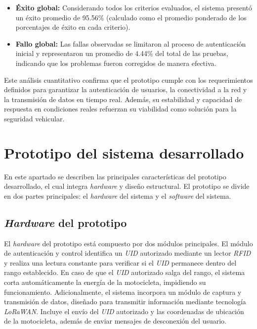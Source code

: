 \begin{itemize}
    \item \textbf{Éxito global:} Considerando todos los criterios evaluados, el sistema presentó un éxito promedio de 95.56\% (calculado como el promedio ponderado de los porcentajes de éxito en cada criterio).
    \item \textbf{Fallo global:} Las fallas observadas se limitaron al proceso de autenticación inicial y representaron un promedio de 4.44\% del total de las pruebas, indicando que los problemas fueron corregidos de manera efectiva.
\end{itemize}

Este análisis cuantitativo confirma que el prototipo cumple con los requerimientos definidos para garantizar la autenticación de usuarios, la conectividad a la red y la transmisión de datos en tiempo real. Además, su estabilidad y capacidad de respuesta en condiciones reales refuerzan su viabilidad como solución para la seguridad vehicular.

\section{Prototipo del sistema desarrollado}

En este apartado se describen las principales características del prototipo desarrollado, el cual integra \textit{hardware} y diseño estructural. El prototipo se divide en dos partes principales: el \textit{hardware} del sistema y el \textit{software} del sistema. 

\subsection{\textit{Hardware} del prototipo}

El \textit{hardware} del prototipo está compuesto por dos módulos principales. El módulo de autenticación y control identifica un \textit{UID} autorizado mediante un lector \textit{RFID} y realiza una lectura constante para verificar si el \textit{UID} permanece dentro del rango establecido. En caso de que el \textit{UID} autorizado salga del rango, el sistema corta automáticamente la energía de la motocicleta, impidiendo su funcionamiento. Adicionalmente, el sistema incorpora un módulo de captura y transmisión de datos, diseñado para transmitir información mediante tecnología \textit{LoRaWAN}. Incluye el envío del \textit{UID} autorizado y las coordenadas de ubicación de la motocicleta, además de enviar mensajes de desconexión del usuario.

